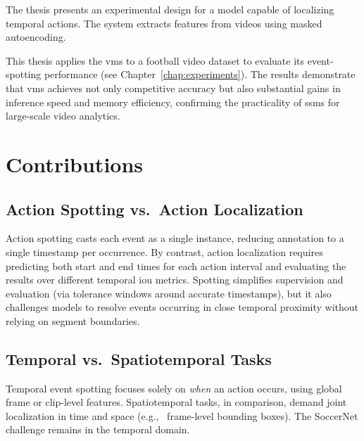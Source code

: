 The thesis presents an experimental design for a model capable of localizing temporal actions. The system extracts features from videos using masked autoencoding.

This thesis applies the \acrlong{vms} to a football video dataset to evaluate its event-spotting performance (see Chapter~\ref{chap:experiments}). The results demonstrate that \acrshort{vms} achieves not only competitive accuracy but also substantial gains in inference speed and memory efficiency, confirming the practicality of \acrfull{ssm}s for large-scale video analytics. 


\section{Contributions}
\subsection{Action Spotting vs.\ Action Localization}
Action spotting casts each event as a single instance, reducing annotation to a single timestamp per occurrence. By contrast, action localization requires predicting both start and end times for each action interval and evaluating the results over different temporal \acrfull{iou} metrics. Spotting simplifies supervision and evaluation (via tolerance windows around accurate timestamps), but it also challenges models to resolve events occurring in close temporal proximity without relying on segment boundaries.

\subsection{Temporal vs.\ Spatiotemporal Tasks}
Temporal event spotting focuses solely on \emph{when} an action occurs, using global frame or clip-level features. Spatiotemporal tasks, in comparison, demand joint localization in time and space (e.g., \ frame-level bounding boxes). The SoccerNet challenge remains in the temporal domain.


